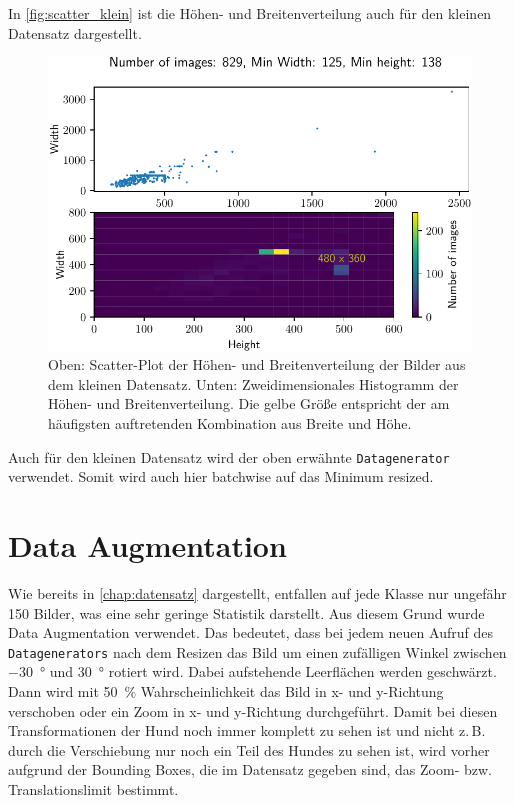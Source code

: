 In \autoref{fig:scatter_klein} ist die Höhen- und Breitenverteilung auch für
den kleinen Datensatz dargestellt.

\begin{figure}
  \centering
  \includegraphics[scale=0.8]{pics/width_height_scatter_hist2d_klein.pdf}
  \caption{Oben: Scatter-Plot der Höhen- und Breitenverteilung der Bilder aus
  dem kleinen Datensatz.
  Unten: Zweidimensionales Histogramm der Höhen- und Breitenverteilung.
  Die gelbe Größe entspricht der am häufigsten auftretenden Kombination
  aus Breite und Höhe.}
  \label{fig:scatter_klein}
\end{figure}

Auch für den kleinen Datensatz wird der oben erwähnte \texttt{Datagenerator}
verwendet. Somit wird auch hier batchwise auf das Minimum resized.

\section{Data Augmentation}
Wie bereits in \autoref{chap:datensatz} dargestellt, entfallen auf jede Klasse nur ungefähr
150 Bilder, was eine sehr geringe Statistik darstellt. Aus diesem Grund wurde
Data Augmentation verwendet. Das bedeutet, dass bei jedem neuen Aufruf des \texttt{Datagenerators}
nach dem Resizen das Bild um einen zufälligen Winkel zwischen \SI{-30}{\degree}
und \SI{30}{\degree} rotiert wird. Dabei aufstehende Leerflächen werden geschwärzt.
Dann wird mit \SI{50}{\percent} Wahrscheinlichkeit das Bild in x- und y-Richtung verschoben
oder ein Zoom in x- und y-Richtung durchgeführt. Damit bei diesen Transformationen
der Hund noch immer komplett zu sehen ist und nicht z.\,B. durch die Verschiebung
nur noch ein Teil des Hundes zu sehen ist, wird vorher aufgrund der Bounding Boxes,
die im Datensatz gegeben sind, das Zoom- bzw. Translationslimit bestimmt.
